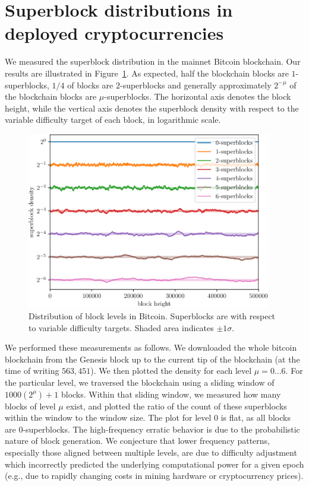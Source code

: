 \section{Superblock distributions in deployed cryptocurrencies}

We measured the superblock distribution in the mainnet Bitcoin blockchain. Our
results are illustrated in Figure~\ref{fig.btc-superblocks}. As expected,
half the blockchain blocks are $1$-superblocks, $1/4$ of blocks are
$2$-superblocks and generally approximately $2^{-\mu}$ of the blockchain blocks
are $\mu$-superblocks. The horizontal axis denotes the block height, while the
vertical axis denotes the superblock density with respect to the variable
difficulty target of each block, in logarithmic scale.

\begin{figure}[h]
\begin{center}
  \includegraphics[width=0.95\textwidth]{figures/bitcoin-superblock-distribution.pdf}
  \caption{Distribution of block levels in Bitcoin. Superblocks are with
    respect to variable difficulty targets. Shaded area indicates
    $\pm1\sigma$.}
  \label{fig.btc-superblocks}
  \end{center}
\end{figure}

We performed these measurements as follows. We downloaded the whole bitcoin
blockchain from the Genesis block up to the current tip of the blockchain
(at the time of writing $563{,}451$). We then plotted the density for each level $\mu = 0 \dots 6$. For the particular level, we traversed the blockchain using
a sliding window of $1000 (2^\mu) + 1$ blocks. Within that sliding window, we
measured how many blocks of level $\mu$ exist, and plotted the ratio of the
count of these superblocks within the window to the window size. The plot for
level $0$ is flat, as all blocks are $0$-superblocks. The high-frequency erratic
behavior is due to the probabilistic nature of block generation. We conjecture
that lower frequency patterns, especially those aligned between multiple levels,
are due to difficulty adjustment which incorrectly predicted the underlying
computational power for a given epoch (e.g., due to rapidly changing costs in
mining hardware or cryptocurrency prices).
